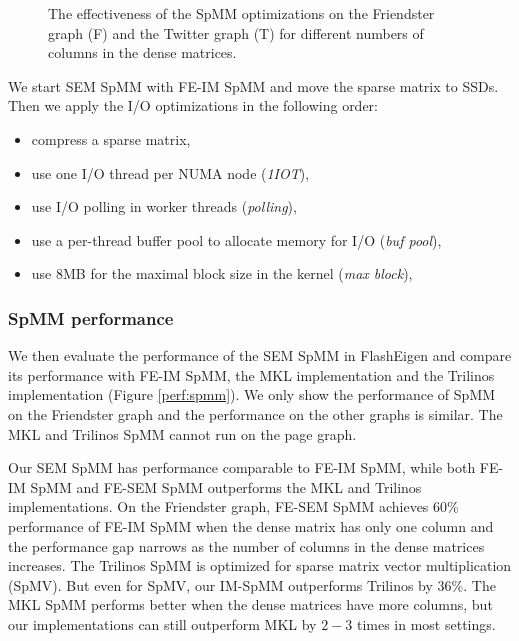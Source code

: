 \begin{figure}
	\begin{center}
		\footnotesize
		
		\caption{The effectiveness of the SpMM optimizations on the Friendster
			graph (F) and the Twitter graph (T) for different numbers of
			columns in the dense matrices.}
		\label{perf:spmm_opt}
	\end{center}
\end{figure}

We start SEM SpMM with FE-IM SpMM and move the sparse matrix to SSDs. Then we
apply the I/O optimizations in the following order:
\begin{itemize} \itemsep1pt \parskip0pt 
	\item compress a sparse matrix,
	\item use one I/O thread per NUMA node (\textit{1IOT}),
	\item use I/O polling in worker threads (\textit{polling}),
	\item use a per-thread buffer pool to allocate memory for I/O
		(\textit{buf pool}),
	\item use 8MB for the maximal block size in the kernel (\textit{max block}),
\end{itemize}

\subsubsection{SpMM performance}

We then evaluate the performance of the SEM SpMM in FlashEigen and compare its
performance with FE-IM SpMM, the MKL implementation and the Trilinos
implementation (Figure \ref{perf:spmm}). We only show the performance of
SpMM on the Friendster graph and the performance on the other graphs is
similar. The MKL and Trilinos SpMM cannot run on the page graph.

Our SEM SpMM has performance comparable to FE-IM SpMM, while both FE-IM SpMM
and FE-SEM SpMM outperforms the MKL and Trilinos implementations.
On the Friendster graph, FE-SEM SpMM achieves 60\% performance of FE-IM SpMM
when the dense matrix has only one column and the performance gap narrows
as the number of columns in the dense matrices increases.
The Trilinos SpMM is optimized for sparse matrix vector multiplication (SpMV).
But even for SpMV, our IM-SpMM outperforms Trilinos by 36\%. The MKL SpMM
performs better when the dense matrices have more columns, but our
implementations can still outperform MKL by $2-3$ times in most settings.

